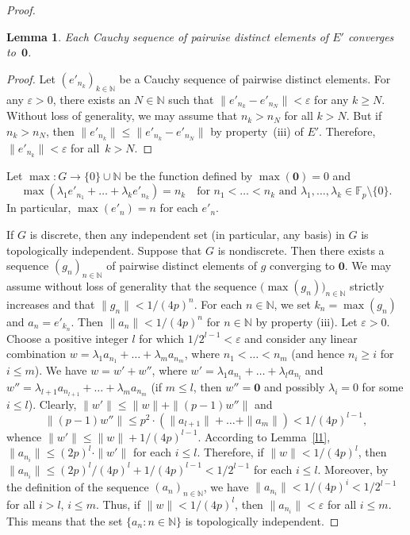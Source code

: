 \documentclass[12pt,a4paper]{amsart}
\newtheorem{lemma}{Lemma}
\theoremstyle{definition}
\newcommand{\zero}{{\mathbf 0}}
\begin{document}
\begin{proof}
\begin{lemma}
\label{l2}
Each Cauchy sequence of pairwise distinct elements of $E'$ converges to~$\zero$.
\end{lemma}

\begin{proof}
Let $(e'_{n_k})_{k\in \mathbb N}$ be a Cauchy sequence of pairwise distinct elements. 
For any $\varepsilon >0$, there exists an $N\in \mathbb N$ such that 
$\|e'_{n_{k}}-e'_{n_N}\|< \varepsilon$ for any $k\ge N$. Without loss of generality, we may assume that 
$n_k>n_N$ for all $k> N$. But if $n_k > n_N$, then 
$\|e'_{n_k}\|\le \|e'_{n_k}-e'_{n_N}\|$ by property~(iii) of $E'$. Therefore, 
$\|e'_{n_k}\|<\varepsilon$ for all~$k > N$.
\end{proof}

Let $\max\colon G\to \{0\}\cup \mathbb N$ be the function defined by $\max(\zero) = 0$ and 
$$
\max (\lambda_1 e'_{n_1} + \dots + \lambda_k e'_{n_k}) = n_k
\quad \text{for $n_1< \dots < n_k$ and $\lambda_1, \dots, \lambda_k\in \mathbb F_p\setminus \{0\}$}.
$$
In particular, $\max(e'_n)=n$ for each $e'_n$.

If $G$ is discrete, then any independent set (in particular, any basis) in $G$ is topologically independent. 
Suppose that $G$ is nondiscrete. Then there exists a sequence $(g_n)_{n\in \mathbb N}$ of pairwise distinct 
elements of $g$ converging to $\zero$. We may assume without loss of generality that the sequence 
$\bigl(\max(g_n)\bigr)_{n\in \mathbb N}$ strictly increases and that $\|g_n\|<1/(4p)^n$. For each $n\in \mathbb 
N$, we set $k_n = \max (g_n)$ and $a_n=e'_{k_n}$. Then $\|a_n\|<1/(4p)^n$ for $n\in \mathbb N$ by property 
(iii). Let $\varepsilon >0$. Choose a positive integer $l$ for which $1/2^{l-1}<\varepsilon$ and consider 
any linear combination $w=\lambda_1 a_{n_1}+ \dots + \lambda_m a_{n_m}$, where $n_1<\dots < n_m$ 
(and hence $n_i\ge i$ for $i\le m$). We have $w = w'+ w''$, where 
$w'=\lambda_1 a_{n_1}+ \dots + \lambda_l a_{n_l}$ and $w''=\lambda_{l+1} a_{n_{l+1}}+ \dots + \lambda_m 
a_{n_m}$ (if $m\le l$, then $w''=\mathbf 0$ and possibly $\lambda_i=0$ for some $i\le l$). 
Clearly,  $\|w'\|\le \|w\|+\|(p-1)w''\|$ and 
$$ 
\|(p-1)w''\|\le p^2\cdot (\|a_{l+1}\|+\dots+\|a_m\|) < 1/(4p)^{l-1}, 
$$ 
whence $\|w'\|\le \|w\|+ 1/(4p)^{l-1}$. According to Lemma~\ref{l1}, $\|a_{n_i}\|\le (2p)^l\cdot 
\|w'\|$ for each $i\le l$. Therefore, if $\|w\|<1/(4p)^l$, then $\|a_{n_i}\|\le (2p)^l/(4p)^l + 
1/(4p)^{l-1} < 1/2^{l-1}$ for each $i\le l$. Moreover, by the definition of the sequence $(a_n)_{n\in 
\mathbb N}$, we have $\|a_{n_i}\|<1/(4p)^i<1/2^{l-1}$ for all $i>l$, $i\le m$. Thus, if 
$\|w\|<1/(4p)^l$, then $\|a_{n_i}\|<\varepsilon$ for all $i\le m$. 
This means that the set $\{a_n: n\in \mathbb N\}$ is topologically independent.
\end{proof}
\end{document}
